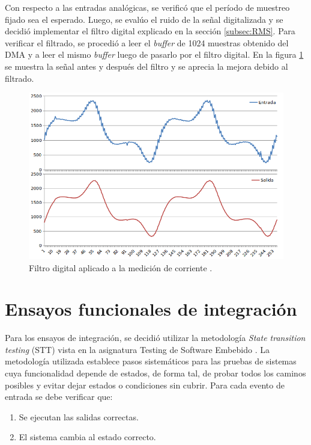 Con respecto a las entradas analógicas, se verificó que el período de muestreo fijado sea el esperado. Luego, se evalúo el ruido de la señal digitalizada y se decidió implementar el filtro digital explicado en la sección \ref{subsec:RMS}. Para verificar el filtrado, se procedió a leer el \textit{buffer} de 1024 muestras obtenido del DMA y a leer el mismo \textit{buffer} luego de pasarlo por el filtro digital. En la figura \ref{fig:filtroPrue} se muestra la señal antes y después del filtro y se aprecia la mejora debido al filtrado.

\begin{figure}[htpb]
	\centering
	\includegraphics[scale=0.6]{./Figures/filtro.png}
	\caption{Filtro digital aplicado a la medición de corriente .}
	\label{fig:filtroPrue}
\end{figure}

\pagebreak

\section{Ensayos funcionales de integración}
Para los ensayos de integración, se decidió utilizar la metodología \textit{State transition testing} (STT) vista en la asignatura Testing de Software Embebido \citep{STT}. La metodología utilizada establece pasos sistemáticos para las pruebas de sistemas cuya funcionalidad depende de estados, de forma tal, de probar todos los caminos posibles y evitar dejar estados o condiciones sin cubrir. Para cada evento de entrada se debe verificar que:

\begin{enumerate}
	\item Se ejecutan las salidas correctas.
	\item El sistema cambia al estado correcto.
\end{enumerate}

